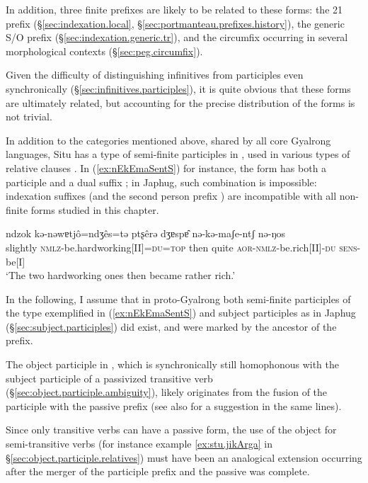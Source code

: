 In addition, three finite prefixes are likely to be related to these forms: the 2\fl{}1  prefix (§\ref{sec:indexation.local}, §\ref{sec:portmanteau.prefixes.history}), the generic S/O  prefix (§\ref{sec:indexation.generic.tr}), and the circumfix  occurring in several morphological contexts (§\ref{sec:peg.circumfix}).

Given the difficulty of distinguishing infinitives from participles even synchronically (§\ref{sec:infinitives.participles}), it is quite obvious that these forms are ultimately related, but accounting for the precise distribution of the forms is not trivial.

In addition to the categories mentioned above, shared by all core Gyalrong languages, Situ has a type of semi-finite participles in , used in various types of relative clauses \citep{jacksonlin07}. In (\ref{ex:nEkEmaSentS}) for instance, the form  has both a participle  and a dual suffix ; in Japhug, such combination is impossible: indexation suffixes (and the second person prefix ) are incompatible with all non-finite forms studied in this chapter. 

\begin{exe}
\ex \label{ex:nEkEmaSentS} 
\gll  ndzok kǝ-nǝwɐtjô=ndʒês=tǝ ptʂêrǝ dʒɐspɐ̂ nǝ-kǝ-maʃe-ntʃ nǝ-ŋos \\
slightly \textsc{nmlz}-be.hardworking[II]=\textsc{du}=\textsc{top} then quite \textsc{aor}-\textsc{nmlz}-be.rich[II]-\textsc{du} \textsc{sens}-be[I] \\
\glt `The two hardworking ones then became rather rich.' \citep[193--194]{lin09phd}
\end{exe}

In the following, I assume that in proto-Gyalrong both semi-finite participles of the type exemplified in (\ref{ex:nEkEmaSentS}) and subject participles as in Japhug (§\ref{sec:subject.participles}) did exist, and were marked by the ancestor of the  prefix.

The object participle in , which is synchronically still homophonous with the subject participle of a passivized transitive verb (§\ref{sec:object.participle.ambiguity}), likely originates from the fusion of the  participle with the passive  prefix (see also \citealt{jackson06guanxiju, jacksonlin07} for a suggestion in the same lines).

Since only transitive verbs can have a passive form, the use of the object for semi-transitive verbs (for instance example \ref{ex:stu.jikArga} in §\ref{sec:object.participle.relatives}) must have been an analogical extension occurring after the merger of the participle prefix and the passive was complete. 

